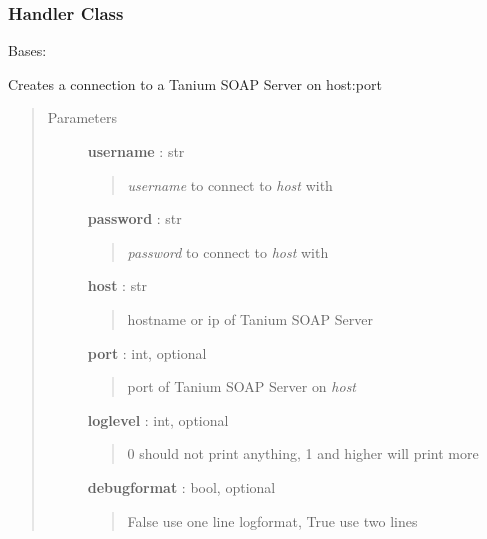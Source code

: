 \documentclass[letterpaper,10pt,english]{sphinxmanual}
\begin{document}
\subsubsection{Handler Class}
\label{pytan.handler:handler-class}

\begin{fulllineitems}
\label{pytan.handler:pytan.handler.Handler}
Bases: \href{http://docs.python.org/2.7/library/functions.html\#object}{}

Creates a connection to a Tanium SOAP Server on host:port
\begin{quote}\begin{description}
\item[{Parameters}] \leavevmode
\textbf{username} : str
\begin{quote}

\emph{username} to connect to \emph{host} with
\end{quote}

\textbf{password} : str
\begin{quote}

\emph{password} to connect to \emph{host} with
\end{quote}

\textbf{host} : str
\begin{quote}

hostname or ip of Tanium SOAP Server
\end{quote}

\textbf{port} : int, optional
\begin{quote}

port of Tanium SOAP Server on \emph{host}
\end{quote}

\textbf{loglevel} : int, optional
\begin{quote}

0 should not print anything, 1 and higher will print more
\end{quote}

\textbf{debugformat} : bool, optional
\begin{quote}

False use one line logformat, True use two lines
\end{quote}

\end{description}\end{quote}



\end{fulllineitems}
\end{document}
